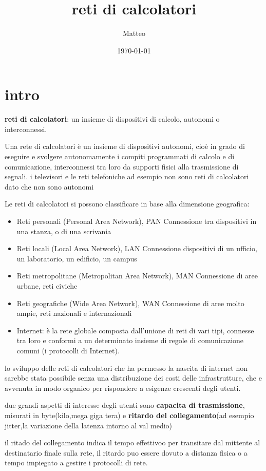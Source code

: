 \documentclass[12pt]{article}
\title{reti di calcolatori }
\author{Matteo}
\date{\today}
\begin{document}
\maketitle
\section{intro}

\textbf{reti di calcolatori}: un insieme di dispositivi di calcolo, autonomi o interconnessi.

Una rete di calcolatori è un insieme di dispositivi autonomi, cioè in grado di eseguire e svolgere autonomamente i compiti
programmati di calcolo e di comunicazione, interconnessi tra loro da supporti fisici alla trasmissione di segnali.
i televisori e le reti telefoniche ad esempio non sono reti di calcolatori dato che non sono autonomi

Le reti di calcolatori si possono classificare in base alla dimensione geografica:
\begin{itemize}
\item Reti personali (Personal Area Network), PAN
 Connessione tra dispositivi in una stanza, o di una scrivania
\item Reti locali (Local Area Network), LAN
 Connessione dispositivi di un ufficio, un laboratorio, un edificio, un campus
\item Reti metropolitane (Metropolitan Area Network), MAN
Connessione di aree urbane, reti civiche
\item Reti geografiche (Wide Area Network), WAN
 Connessione di aree molto ampie, reti nazionali e internazionali
\item Internet: è la rete globale composta dall’unione di reti di vari tipi, connesse tra loro e conformi a un
determinato insieme di regole di comunicazione comuni (i protocolli di Internet).
\end{itemize}

lo sviluppo delle reti di calcolatori che ha permesso la nascita di internet non sarebbe stata possibile senza una 
distribuzione dei costi delle infrastrutture, che e avvenuta in modo organico per rispondere a esigenze crescenti degli utenti.

due grandi aspetti di interesse degli utenti sono \textbf{capacita di trasmissione}, misurati in byte(kilo,mega giga tera) e \textbf{ritardo del collegamento}(ad esempio jitter,la variazione della latenza intorno al val medio)

il ritado del collegamento indica il tempo effettivoo per transitare dal mittente al destinatario finale sulla rete, il ritardo puo essere dovuto a distanza fisica o a tempo impiegato a gestire i protocolli di rete.
\end{document}
